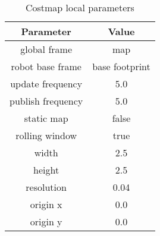 \begin{table}[H]
    \centering
    \begin{tabular}{cc}
    \textbf{Parameter} & \textbf{Value} \\\toprule
    global frame & map\\
    robot base frame & base footprint\\
    update frequency & 5.0\\
    publish frequency & 5.0\\
    static map & false\\
    rolling window & true\\
    width & 2.5\\
    height & 2.5\\
    resolution & 0.04\\
    origin x & 0.0\\
    origin y & 0.0\\
    \end{tabular}
    \caption{Costmap local parameters}\label{tab:costmap_local}
\end{table}

